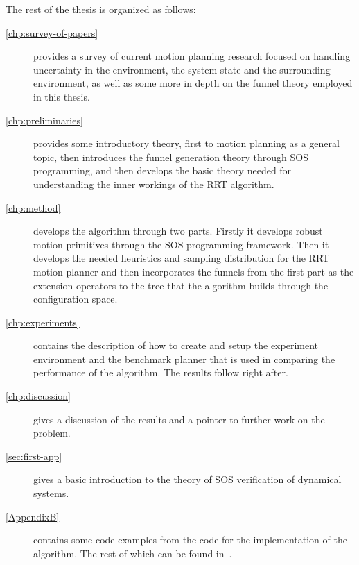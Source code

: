 The rest of the thesis is organized as follows:
\begin{description}
\item[\cref{chp:survey-of-papers}] provides a survey of current motion planning
  research focused on handling uncertainty in the environment, the system state
  and the surrounding environment, as well as some more in depth on the funnel
  theory employed in this thesis.
    
\item[\cref{chp:preliminaries}] provides some introductory theory, first to
  motion planning as a general topic, then introduces the funnel generation
  theory through \ac{SOS} programming, and then develops the basic theory needed
  for understanding the inner workings of the \ac{RRT} algorithm.
    
\item[\cref{chp:method}] develops the \rrtfunnel{} algorithm through two parts.
  Firstly it develops robust motion primitives through the \ac{SOS} programming
  framework. Then it develops the needed heuristics and sampling distribution
  for the \ac{RRT} motion planner and then incorporates the funnels from the
  first part as the extension operators to the tree that the algorithm builds
  through the configuration space.
    
\item[\cref{chp:experiments}] contains the description of how to create and
  setup the experiment environment and the benchmark planner that is used in
  comparing the performance of the \rrtfunnel{} algorithm. The results follow
  right after.
    
\item[\cref{chp:discussion}] gives a discussion of the results and a pointer to
  further work on the problem.

\item[\cref{sec:first-app}] gives a basic introduction to the theory of \ac{SOS}
  verification of dynamical systems.

\item[\cref{AppendixB}] contains some code examples from the code for the
  implementation of the \rrtfunnel{} algorithm. The rest of which can be found
  in~\cite{MasterThesisCode2019}.

\end{description}


